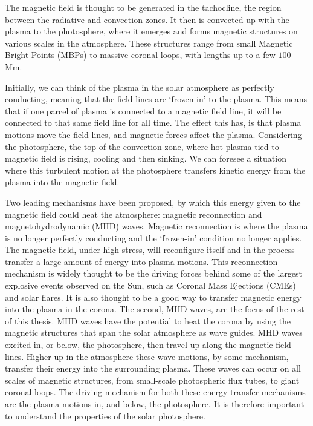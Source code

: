 \documentclass[a4paper,12pt,fourier,authoryear,custommargin]{Classes/PhDThesisPSnPDF}
\begin{document}
The magnetic field is thought to be generated in the tachocline, the region between the radiative and convection zones.
It then is convected up with the plasma to the photosphere, where it emerges and forms magnetic structures on various scales in the atmosphere.
These structures range from small Magnetic Bright Points (MBPs) to massive coronal loops, with lengths up to a few $100$ Mm.

Initially, we can think of the plasma in the solar atmosphere as perfectly conducting, meaning that the field lines are `frozen-in' to the plasma.
This means that if one parcel of plasma is connected to a magnetic field line, it will be connected to that same field line for all time.
The effect this has, is that plasma motions move the field lines, and magnetic forces affect the plasma.
Considering the photosphere, the top of the convection zone, where hot plasma tied to magnetic field is rising, cooling and then sinking.
We can foresee a situation where this turbulent motion at the photosphere transfers kinetic energy from the plasma into the magnetic field.

Two leading mechanisms have been proposed, by which this energy given to the magnetic field could heat the atmosphere: magnetic reconnection and magnetohydrodynamic (MHD) waves.
Magnetic reconnection is where the plasma is no longer perfectly conducting and the `frozen-in' condition no longer applies.
The magnetic field, under high stress, will reconfigure itself and in the process transfer a large amount of energy into plasma motions.
This reconnection mechanism is widely thought to be the driving forces behind some of the largest explosive events observed on the Sun, such as Coronal Mass Ejections (CMEs) and solar flares.
It is also thought to be a good way to transfer magnetic energy into the plasma in the corona.
The second, MHD waves, are the focus of the rest of this thesis.
MHD waves have the potential to heat the corona by using the magnetic structures that span the solar atmosphere as wave guides.
MHD waves excited in, or below, the photosphere, then travel up along the magnetic field lines.
Higher up in the atmosphere these wave motions, by some mechanism, transfer their energy into the surrounding plasma.
These waves can occur on all scales of magnetic structures, from small-scale photospheric flux tubes, to giant coronal loops.
The driving mechanism for both these energy transfer mechanisms are the plasma motions in, and below, the photosphere.
It is therefore important to understand the properties of the solar photosphere.
\end{document}

